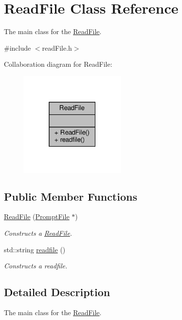 \hypertarget{classReadFile}{}\section{Read\+File Class Reference}
\label{classReadFile}


The main class for the \hyperlink{classReadFile}{Read\+File}.  




{\ttfamily \#include $<$read\+File.\+h$>$}



Collaboration diagram for Read\+File\+:\nopagebreak
\begin{figure}[H]
\begin{center}
\leavevmode
\includegraphics[width=151pt]{classReadFile__coll__graph}
\end{center}
\end{figure}
\subsection*{Public Member Functions}
\begin{DoxyCompactItemize}
\item 
\hyperlink{classReadFile_a3e850c6e8b8ac013ea4510dbff1d4d8b}{Read\+File} (\hyperlink{classPromptFile}{Prompt\+File} $\ast$)
\begin{DoxyCompactList}\small\item\em Constructs a \hyperlink{classReadFile}{Read\+File}. \end{DoxyCompactList}\item 
std\+::string \hyperlink{classReadFile_a2c5a99e9936bc69c340adc304ccb5d45}{readfile} ()
\begin{DoxyCompactList}\small\item\em Constructs a readfile. \end{DoxyCompactList}\end{DoxyCompactItemize}


\subsection{Detailed Description}
The main class for the \hyperlink{classReadFile}{Read\+File}. 

